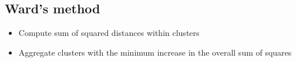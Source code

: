 \documentclass[a4paper,12pt]{article}
\begin{document}
%
%
%
%
%





\subsection{Ward's method}
\begin{itemize}
	\item  Compute sum of squared distances within clusters
	\item  Aggregate clusters with the minimum increase in the
	overall sum of squares
\end{itemize}
\end{document}

